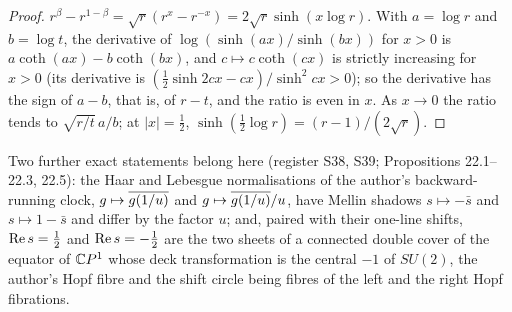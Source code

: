 \begin{proof}
$r^\beta-r^{1-\beta}=\sqrt r(r^x-r^{-x})=2\sqrt r\sinh(x\log r)$. With $a=\log r$ and $b=\log t$, the derivative of $\log(\sinh(ax)/\sinh(bx))$ for $x>0$ is $a\coth(ax)-b\coth(bx)$, and $c\mapsto c\coth(cx)$ is strictly increasing for $x>0$ (its derivative is $(\tfrac12\sinh2cx-cx)/\sinh^2cx>0$); so the derivative has the sign of $a-b$, that is, of $r-t$, and the ratio is even in $x$. As $x\to0$ the ratio tends to $\sqrt{r/t}\,a/b$; at $|x|=\tfrac12$, $\sinh(\tfrac12\log r)=(r-1)/(2\sqrt r)$.
\end{proof}

Two further exact statements belong here (register S38, S39;  Propositions 22.1--22.3, 22.5): the Haar and Lebesgue normalisations of the author's backward-running clock, $g\mapsto\overline{g(1/u)}$ and $g\mapsto\overline{g(1/u)}/u$, have Mellin shadows $s\mapsto-\bar s$ and $s\mapsto1-\bar s$ and differ by the factor $u$; and, paired with their one-line shifts, $\operatorname{Re} s=\tfrac12$ and $\operatorname{Re} s=-\tfrac12$ are the two sheets of a connected double cover of the equator of $\mathbb{C} P^1$ whose deck transformation is the central $-1$ of $SU(2)$, the author's Hopf fibre and the shift circle being fibres of the left and the right Hopf fibrations.
